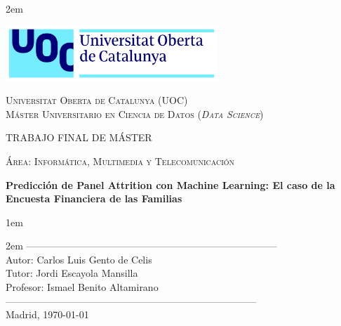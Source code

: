 \newpage
\thispagestyle{empty}

\baselineskip 2em


\centerline{\includegraphics[width=0.6\textwidth]{images/UOC-logo}}
\begin{center}
\textsc{Universitat Oberta de Catalunya (UOC) \\
 Máster Universitario en Ciencia de Datos (\textit{Data Science})\\}


\vspace*{1.5cm}

\textsc{\Large TRABAJO FINAL DE MÁSTER}

\vspace*{0.5cm}

\textsc{\large Área: Informática, Multimedia y Telecomunicación}



\vspace*{2.0cm}

\textbf{\Large Predicción de Panel Attrition con Machine Learning: El caso de la Encuesta Financiera de las Familias}

\textbf{\large }

\vspace{2.5cm}
\baselineskip 1em

\baselineskip 2em
-----------------------------------------------------------------------------\\
Autor:      Carlos Luis Gento de Celis\\
Tutor:      Jordi Escayola Mansilla\\
Profesor:   Ismael Benito Altamirano\\
-----------------------------------------------------------------------------\\
\vspace*{1.5cm}
Madrid, \today

\end{center}

\newpage
\pagestyle{empty}
\hfill
